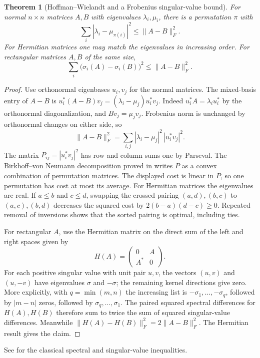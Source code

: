 \documentclass[11pt,oneside,openany]{book}
\theoremstyle{plain}
\newtheorem{theorem}{Theorem}[chapter]
\theoremstyle{definition}
\theoremstyle{remark}
\begin{document}
\begin{theorem}[Hoffman--Wielandt and a Frobenius singular-value bound]
\label{p206:W43}
For normal \(n\times n\) matrices \(A,B\) with eigenvalues
\(\lambda_i,\mu_i\), there is a permutation \(\pi\) with
\[
        \sum_i|\lambda_i-\mu_{\pi(i)}|^2\le\|A-B\|_F^2 .
\]
For Hermitian matrices one may match the eigenvalues in increasing
order. For rectangular matrices \(A,B\) of the same size,
\[
        \sum_i\bigl(\sigma_i(A)-\sigma_i(B)\bigr)^2\le\|A-B\|_F^2 .
\]
\end{theorem}
\begin{proof}
Use orthonormal eigenbases \(u_i,v_j\) for the normal matrices.
The mixed-basis entry of \(A-B\) is
\(u_i^*(A-B)v_j=(\lambda_i-\mu_j)u_i^*v_j\).
Indeed \(u_i^*A=\lambda_i u_i^*\) by the orthonormal
diagonalization, and \(Bv_j=\mu_jv_j\).
Frobenius norm is unchanged by orthonormal changes on either side,
so
\[
  \|A-B\|_F^2=\sum_{i,j}|\lambda_i-\mu_j|^2\,|u_i^*v_j|^2.
\]
The matrix \(P_{ij}=|u_i^*v_j|^2\) has row and column sums one
by Parseval. The Birkhoff--von Neumann decomposition proved
in \cite[Chapter 8, W42]{p205} writes \(P\) as a convex
combination of permutation matrices. The displayed cost is
linear in \(P\), so one permutation has cost at most its average.
For Hermitian matrices the eigenvalues are real. If
\(a\le b\) and \(c\le d\), swapping the crossed pairing
\((a,d),(b,c)\) to \((a,c),(b,d)\) decreases the squared cost by
\(2(b-a)(d-c)\ge0\). Repeated removal of inversions shows that
the sorted pairing is optimal, including ties.

For rectangular \(A\), use the Hermitian matrix on the direct sum
of the left and right spaces given by
\[
                  H(A)=\begin{pmatrix}0&A\\A^*&0\end{pmatrix}.
\]
For each positive singular value with unit pair \(u,v\),
the vectors \((u,v)\) and \((u,-v)\) have eigenvalues
\(\sigma\) and \(-\sigma\); the remaining kernel directions give
zero. More explicitly, with \(q=\min(m,n)\) the increasing list
is \(-\sigma_1,\ldots,-\sigma_q\), followed by \(|m-n|\) zeros,
followed by \(\sigma_q,\ldots,\sigma_1\).
The paired squared spectral differences for \(H(A),H(B)\)
therefore sum to twice the sum of squared singular-value
differences. Meanwhile
\(\|H(A)-H(B)\|_F^2=2\|A-B\|_F^2\).
The Hermitian result gives the claim.
\end{proof}
See \cite{hoffman,mirsky} for the classical spectral and
singular-value inequalities.
\end{document}
